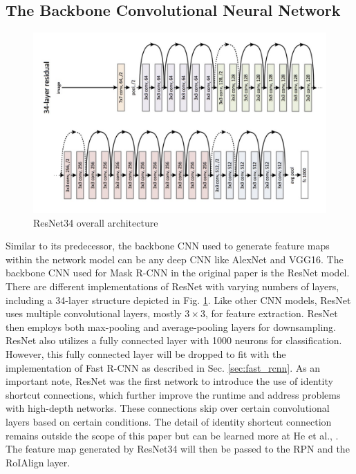 \subsection{The Backbone Convolutional Neural Network}

\begin{figure}[!ht]
    \centering
    \includegraphics[width=6in]{figures/resnet34_archite.png}
    \caption{ResNet34 overall architecture \cite{resnet_2016}} \label{fig:resnet_archite}
\end{figure}

Similar to its predecessor, the backbone CNN used to generate feature maps within the network model can be any deep CNN like AlexNet and VGG16. The backbone CNN used for Mask R-CNN in the original paper is the ResNet model. There are different implementations of ResNet with varying numbers of layers, including a 34-layer structure depicted in Fig. \ref{fig:resnet_archite}. Like other CNN models, ResNet uses multiple convolutional layers, mostly $3 \times 3$, for feature extraction. ResNet then employs both max-pooling and average-pooling layers for downsampling. ResNet also utilizes a fully connected layer with 1000 neurons for classification. However, this fully connected layer will be dropped to fit with the implementation of Fast R-CNN as described in Sec. \ref{sec:fast_rcnn}. As an important note, ResNet was the first network to introduce the use of identity shortcut connections, which further improve the runtime and address problems with high-depth networks. These connections skip over certain convolutional layers based on certain conditions. The detail of identity shortcut connection remains outside the scope of this paper but can be learned more at He et al., \cite{resnet_2016}. The feature map generated by ResNet34 will then be passed to the RPN and the RoIAlign layer.

